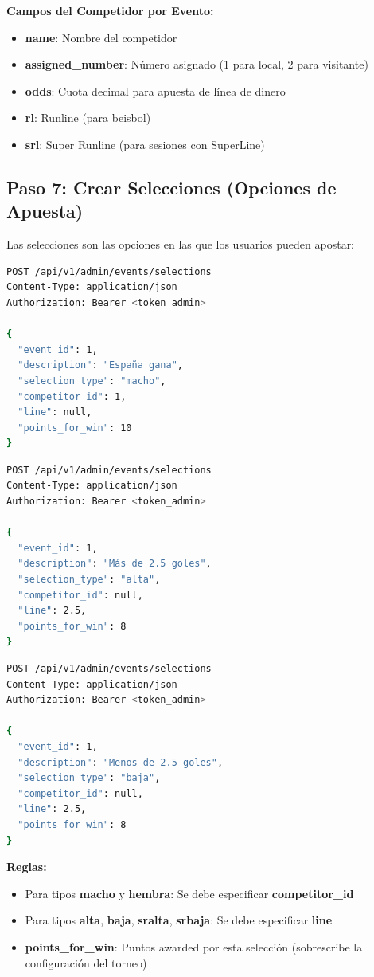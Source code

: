 \documentclass[12pt,a4paper]{article}
\begin{document}
\textbf{Campos del Competidor por Evento:}
\begin{itemize}
    \item \textbf{name}: Nombre del competidor
    \item \textbf{assigned\_number}: Número asignado (1 para local, 2 para visitante)
    \item \textbf{odds}: Cuota decimal para apuesta de línea de dinero
    \item \textbf{rl}: Runline (para beisbol)
    \item \textbf{srl}: Super Runline (para sesiones con SuperLine)
\end{itemize}

\subsection{Paso 7: Crear Selecciones (Opciones de Apuesta)}
Las selecciones son las opciones en las que los usuarios pueden apostar:

\begin{lstlisting}[language=bash]
POST /api/v1/admin/events/selections
Content-Type: application/json
Authorization: Bearer <token_admin>

{
  "event_id": 1,
  "description": "España gana",
  "selection_type": "macho",
  "competitor_id": 1,
  "line": null,
  "points_for_win": 10
}
\end{lstlisting}

\begin{lstlisting}[language=bash]
POST /api/v1/admin/events/selections
Content-Type: application/json
Authorization: Bearer <token_admin>

{
  "event_id": 1,
  "description": "Más de 2.5 goles",
  "selection_type": "alta",
  "competitor_id": null,
  "line": 2.5,
  "points_for_win": 8
}
\end{lstlisting}

\begin{lstlisting}[language=bash]
POST /api/v1/admin/events/selections
Content-Type: application/json
Authorization: Bearer <token_admin>

{
  "event_id": 1,
  "description": "Menos de 2.5 goles",
  "selection_type": "baja",
  "competitor_id": null,
  "line": 2.5,
  "points_for_win": 8
}
\end{lstlisting}

\textbf{Reglas:}
\begin{itemize}
    \item Para tipos \textbf{macho} y \textbf{hembra}: Se debe especificar \textbf{competitor\_id}
    \item Para tipos \textbf{alta}, \textbf{baja}, \textbf{sralta}, \textbf{srbaja}: Se debe especificar \textbf{line}
    \item \textbf{points\_for\_win}: Puntos awarded por esta selección (sobrescribe la configuración del torneo)
\end{itemize}
\end{document}

